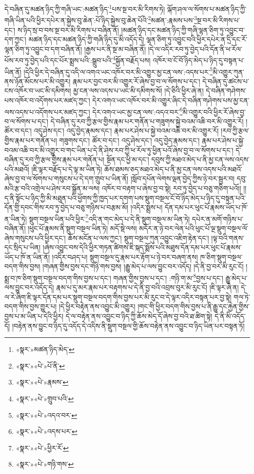 དེ་བཞིན་དུ་མཚན་ཉིད་ཀྱི་གཞི་ཡང་:མཚན་ཉིད་\footnote{«སྣར་»མཚན་ཉིད་མེད་}པས་སྔ་བར་མི་རིགས་ཏེ། ལྐོག་ཤལ་ལ་སོགས་པ་མཚན་ཉིད་ཀྱི་གཞི་ཡིན་པའི་ཕྱིར་དཔེར་ན་སྐྱེས་བུ་ཆེན་:པོ་ཉིད་སྐྱེས་བུ་ཆེན་པོའི་\footnote{«སྣར་»«པེ་»པོ་ནི་}མཚན་:རྣམས་པས་\footnote{«སྣར་»«པེ་»རྣམས་}སྔ་བར་མི་རིགས་པ་དང་། ས་ཉིད་སྲ་བ་བས་སྔ་བར་མི་རིགས་པ་བཞིན་ནོ། །མཚན་ཉིད་དང་མཚན་ཉིད་ཀྱི་གཞི་ལྷན་ཅིག་ཏུ་འབྱུང་བ་དག་ཀྱང་། མཚན་ཉིད་དང་མཚན་ཉིད་ཀྱི་གཞི་ཉིད་དུ་མི་འདོད་དེ། ལྷན་ཅིག་ཏུ་འབྱུང་བའི་ཕྱིར་དཔེར་ན་དྲི་དང་རོ་ལྷན་ཅིག་ཏུ་འབྱུང་བ་དག་བཞིན་ནོ། །རྒྱས་པར་ནི་སྔ་མ་བཞིན་ནོ། །དེ་ལ་འདིར་རབ་ཏུ་བྱེད་པའི་དོན་ནི་ཕ་རོལ་པོས་རབ་ཏུ་བྱེད་པའི་དང་པོར་སྨྲས་པའི་:སྒྲུབ་པའི་\footnote{«སྣར་»«པེ་»གྲུབ་པའི་}སྐྱོན་བརྗོད་པས། འཁོར་བ་ངོ་བོ་ཉིད་མེད་པ་ཉིད་དུ་བསྟན་པ་ཡིན་ནོ། །དེའི་ཕྱིར་དེ་བཞིན་དུ་འདི་ལ་འགའ་ཡང་འཁོར་བར་མི་འགྱུར་མྱ་ངན་ལས་:འདས་པར་\footnote{«སྣར་»«པེ་»འདའ་བར་}མི་འགྱུར་ཀུན་ནས་ཉོན་མོངས་པར་མི་འགྱུར། རྣམ་པར་བྱང་བར་མི་འགྱུར་རོ་ཞེས་བྱ་བ་ལ་སོགས་པ་དང་། དེ་བཞིན་དུ་ཚངས་པ་ངས་འཁོར་བ་ཡང་མི་དམིགས། མྱ་ངན་ལས་འདས་པ་ཡང་མི་དམིགས་སོ། །དེ་ཅིའི་ཕྱིར་ཞེ་ན། དེ་བཞིན་གཤེགས་པས་འཁོར་བ་འདོགས་པར་མཛད་ཀྱང་། དེར་འགའ་ཡང་འཁོར་བར་མི་འགྱུར་ཞིང་དེ་བཞིན་གཤེགས་པས་མྱ་ངན་ལས་འདས་པ་འདོགས་པར་མཛད་ཀྱང་། དེར་འགའ་ཡང་མྱ་ངན་ལས་:འདའ་བར་\footnote{«སྣར་»«པེ་»འདས་པར་}མི་འགྱུར་བའི་ཕྱིར་རོ་ཞེས་བྱ་བ་ལ་སོགས་པ་དང་། དེ་བཞིན་དུ་རབ་ཀྱི་རྩལ་གྱིས་རྣམ་པར་གནོན་པ་གཟུགས་སྐྱེ་བའམ་འཆི་བར་མི་འགྱུར་རོ། །ཚོར་བ་དང་། འདུ་ཤེས་དང་། འདུ་བྱེད་རྣམས་དང་། རྣམ་པར་ཤེས་པ་སྐྱེ་བའམ་འཆི་བར་མི་འགྱུར་རོ། །རབ་ཀྱི་རྩལ་གྱིས་རྣམ་པར་གནོན་པ། གཟུགས་དང་། ཚོར་བ་དང་། འདུ་ཤེས་དང་། འདུ་བྱེད་རྣམས་དང་། རྣམ་པར་ཤེས་པ་སྐྱེ་བའམ་འཆི་བར་མི་འགྱུར་བ་གང་ཡིན་པ་དེ་ནི་ཤེས་རབ་ཀྱི་ཕ་རོལ་ཏུ་ཕྱིན་པའོ་ཞེས་བྱ་བ་ལ་སོགས་པ་དང་། དེ་བཞིན་དུ་རབ་ཀྱི་རྩལ་གྱིས་རྣམ་པར་གནོན་པ། སྔོན་དང་ཕྱི་མ་དང་། དབུས་ཀྱི་མཐའ་མེད་པ་ནི་མྱ་ངན་ལས་འདས་པའི་མཐའོ། །ཇི་ལྟར་བརྗོད་པ་དེ་ལྟ་མ་ཡིན་ཏེ། ཆོས་ཐམས་ཅད་མཐའ་མེད་པ་ནི་མྱ་ངན་ལས་འདས་པའི་མཐའོ་ཞེས་བྱ་བ་ལ་སོགས་པ་གསུངས་པ་དེ་དག་གྲུབ་པ་ཡིན་ནོ། །སློབ་དཔོན་ལེགས་ལྡན་བྱེད་ཀྱིས་ཉེ་བར་སྦྱར་བ། དབུ་མའི་རྩ་བའི་འགྲེལ་པ་ཤེས་རབ་སྒྲོན་མ་ལས། འཁོར་བ་བརྟག་པ་ཞེས་བྱ་བ་སྟེ། རབ་ཏུ་བྱེད་པ་བཅུ་གཅིག་པའོ།། །།ད་ནི་སྟོང་པ་ཉིད་ཀྱི་མི་མཐུན་པའི་ཕྱོགས་ཀྱི་ཁྱད་པར་དགག་པས་སྡུག་བསྔལ་ངོ་བོ་ཉིད་མེད་པ་ཉིད་དུ་བསྟན་པའི་དོན་གྱི་དབང་གིས་རབ་ཏུ་བྱེད་པ་བཅུ་གཉིས་པ་བརྩམ་མོ། །འདིར་སྨྲས་པ། དོན་དམ་པར་ཕུང་པོ་རྣམས་ཡོད་པ་ཁོ་ན་ཡིན་ཏེ། སྡུག་བསྔལ་ཡིན་པའི་ཕྱིར་\footnote{«སྣར་»«པེ་»ཕྱིར་རོ་}འདི་ན་གང་མེད་པ་དེ་ནི་སྡུག་བསྔལ་མ་ཡིན་ཏེ། དཔེར་ན་མགོ་གཉིས་པ་བཞིན་ནོ། །ཕུང་པོ་རྣམས་ནི་སྡུག་བསྔལ་ཡིན་ཏེ། མདོ་སྡེ་ལས། མདོར་ན་ཉེ་བར་ལེན་པའི་ཕུང་པོ་ལྔ་སྡུག་བསྔལ་ལོ་ཞེས་གསུངས་པའི་ཕྱིར་དང་། ཆོས་མངོན་པ་ལས་ཀྱང་། སྡུག་བསྔལ་ཀུན་འབྱུང་འཇིག་རྟེན་དང་། །ལྟ་བའི་གནས་དང་སྲིད་པ་ཡིན། །ཞེས་འབྱུང་བས་དེའི་ཕྱིར་གཏན་ཚིགས་ཇི་སྐད་སྨོས་པའི་མཐུས་དོན་དམ་པར་ཕུང་པོ་རྣམས་ཡོད་པ་ཁོ་ན་ཡིན་ནོ། །འདིར་བཤད་པ། སྡུག་བསྔལ་དུ་རྣམ་པར་རྟོག་པ་ཉེ་བར་བཞག་ནས། ཁ་ཅིག་སྡུག་བསྔལ་བདག་གིས་བྱས། །གཞན་གྱིས་བྱས་དང་གཉི་གས་བྱས། །རྒྱུ་མེད་པ་ལས་བྱུང་བར་འདོད། །དེ་ནི་བྱ་བར་མི་རུང་ངོ། །སྨྲ་བ་ཁ་ཅིག་སྡུག་བསྔལ་བདག་གིས་བྱས་པ་དང་། གཞན་གྱིས་བྱས་པ་དང་། :གཉི་ག་མ་\footnote{«སྣར་»«པེ་»གཉི་གས་}བྱས་པ་དང་། རྒྱུ་མེད་པ་ལས་བྱུང་བར་འདོད་དེ། རྣམ་པ་དུ་མར་རྣམ་པར་བརྟགས་པ་དེ་ནི་བྱ་བའི་འབྲས་བུར་མི་རུང་ངོ། །ཇི་ལྟར་ཞེ་ན། དེ་ལ་རེ་ཞིག་ཇི་ལྟར་དོན་དམ་པར་སྡུག་བསྔལ་བདག་གིས་བྱས་པར་མི་རུང་བ་དེ་ལྟར་འདིར་བསྟན་པར་བྱ་སྟེ། གལ་ཏེ་བདག་གིས་བྱས་གྱུར་པ། །དེ་ཕྱིར་བརྟེན་ནས་འབྱུང་མི་འགྱུར། །གང་གི་ཕྱིར་བདག་གིས་བྱས་པ་ནི་རྒྱུ་དང་རྐྱེན་གྱིས་བྱས་པ་མ་ཡིན་པ་དེའི་ཕྱིར། དེ་ལ་བརྟེན་ནས་འབྱུང་བ་ཉིད་ཀྱི་ཆོས་མེད་དོ་ཞེས་བྱ་བའི་ཐ་ཚིག་སྟེ། དེ་ནི་མི་འདོད་དོ། །བརྟེན་ནས་བྱུང་བ་ཉིད་དུ་འདོད་དེ་འདིས་ནི་སྡུག་བསྔལ་གྱི་ཆོས་བརྟེན་ནས་འབྱུང་བ་ཉིད་ཡིན་པར་བསྟན་ཏོ། 